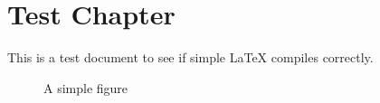 \documentclass[11pt,twoside]{book}
\begin{document}
\chapter{Test Chapter}
This is a test document to see if simple LaTeX compiles correctly.

\begin{figure}[h]
\centering
{}
\caption{A simple figure}
\end{figure}
\end{document}
